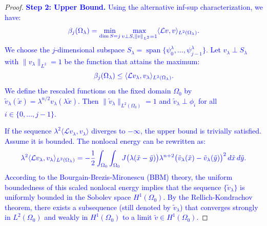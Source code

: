 \documentclass[12pt, a4paper]{article}
\newcommand{\revision}[1]{\textcolor{blue}{#1}}
\theoremstyle{break}
\theoremstyle{break}
\theoremstyle{break}
\theoremstyle{break}
\theoremstyle{break}
\theoremstyle{break}
\theoremstyle{break}
\theoremstyle{break}
\theoremstyle{break}
\begin{document}
\begin{proof}
    \revision{\textbf{Step 2: Upper Bound.} Using the alternative inf-sup characterization, we have:}
    \begin{equation}
        \label{eq:courant_fischer_L_upper}
        \revision{\beta_j(\Omega_\lambda) = \min_{\dim S = j} \max_{v \perp S, \|v\|_{L^2} = 1} \langle \mathcal{L}v, v \rangle_{L^2(\Omega_\lambda)}.}
    \end{equation}
    \revision{We choose the $j$-dimensional subspace $S_\lambda = \operatorname{span}\{\psi_0^\lambda, \dots, \psi_{j-1}^\lambda\}$. Let $v_\lambda \perp S_\lambda$ with $\|v_\lambda\|_{L^2} = 1$ be the function that attains the maximum:}
    \begin{equation}
        \revision{\beta_j(\Omega_\lambda) \leq \langle \mathcal{L}v_\lambda, v_\lambda \rangle_{L^2(\Omega_\lambda)}.}
    \end{equation}
    \revision{We define the rescaled functions on the fixed domain $\Omega_0$ by $\tilde{v}_\lambda(\tilde{x}) = \lambda^{n/2} v_\lambda(\lambda \tilde{x})$. Then $\|\tilde{v}_\lambda\|_{L^2(\Omega_0)} = 1$ and $\tilde{v}_\lambda \perp \phi_i$ for all $i \in \{0, \dots, j-1\}$.} 
    
    \revision{If the sequence $\lambda^2 \langle \mathcal{L}v_\lambda, v_\lambda \rangle$ diverges to $-\infty$, the upper bound is trivially satisfied. Assume it is bounded. The nonlocal energy can be rewritten as:}
    \begin{equation}
        \revision{\lambda^2 \langle \mathcal{L}v_\lambda, v_\lambda \rangle_{L^2(\Omega_\lambda)} = -\frac{1}{2} \int_{\Omega_0} \int_{\Omega_0} J\big(\lambda(\tilde{x}-\tilde{y})\big) \lambda^{n+2} \big( \tilde{v}_\lambda(\tilde{x}) - \tilde{v}_\lambda(\tilde{y}) \big)^2 \, d\tilde{x} \, d\tilde{y}.}
    \end{equation}
    \revision{According to the Bourgain-Brezis-Mironescu (BBM) theory, the uniform boundedness of this scaled nonlocal energy implies that the sequence $\{\tilde{v}_\lambda\}$ is uniformly bounded in the Sobolev space $H^1(\Omega_0)$. By the Rellich-Kondrachov theorem, there exists a subsequence (still denoted by $\tilde{v}_\lambda$) that converges strongly in $L^2(\Omega_0)$ and weakly in $H^1(\Omega_0)$ to a limit $\tilde{v} \in H^1(\Omega_0)$.} 
    

\end{proof}
\end{document}
